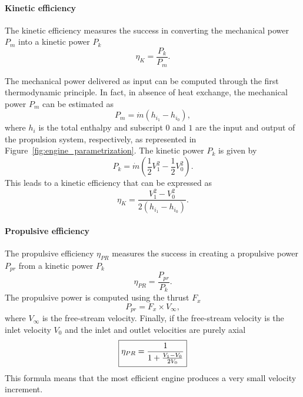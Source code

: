 \paragraph{Kinetic efficiency}
The kinetic efficiency measures the success in converting the mechanical
power $P_m$ into a kinetic power $P_k$
\begin{equation}
	\eta_K = \frac{P_k}{P_m}.
\end{equation}

The mechanical power delivered as input
can be computed through the first thermodynamic principle. In fact, in absence
of heat exchange, the mechanical power $P_m$ can be estimated as
\begin{equation}
	P_m = \dot{m} (h_{i_{1}} - h_{i_{0}}),
\end{equation}
where $h_i$ is the total enthalpy and subscript $0$ and $1$ are
the input and output of the propulsion system, respectively, as represented
in Figure~\ref{fig:engine_parametrization}.
The kinetic power $P_k$ is given by
\begin{equation}
	P_k = \dot{m} \left(\frac{1}{2} V^2_{1} -
	\frac{1}{2} V^2_{0} \right).
\end{equation}
This leads to a kinetic efficiency that can be expressed as
\begin{equation}
	\eta_{K} = \frac{V^2_{1} - V^2_{0}}{2 (h_{i_{1}} - h_{i_{0}})}.
\end{equation}

\paragraph{Propulsive efficiency}
The propulsive efficiency $\eta_{PR}$ measures the success
in creating a propulsive power $P_{pr}$ from a
kinetic power $P_k$
\begin{equation}
	\eta_{PR} = \frac{P_{pr}}{P_k}.
\end{equation}
The propulsive power is computed using the thrust $F_x$
\begin{equation}
	P_{pr} = F_x \times V_{\infty},
\end{equation}
where $V_{\infty}$ is the free-stream velocity.
Finally, if the free-stream velocity is the inlet velocity $V_{0}$
and the inlet and outlet velocities are purely axial
\begin{equation}
	\fbox{$
	\eta_{PR} = \displaystyle \frac{1}{1 + \frac{V_{1} - V_{0}}{2 V_{0}}}
	$}
	\label{eq:cror_propulsive_efficiency}
\end{equation}
This formula means that the most efficient engine produces
a very small velocity increment.


